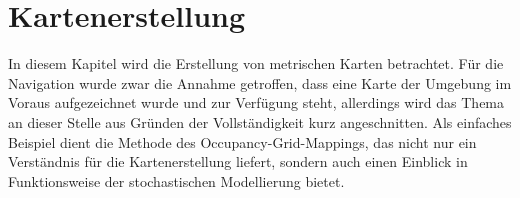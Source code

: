 \chapter{Kartenerstellung}
In diesem Kapitel wird die Erstellung von metrischen Karten betrachtet. Für die Navigation wurde zwar die Annahme getroffen, dass eine Karte der Umgebung im Voraus aufgezeichnet wurde und zur Verfügung steht, allerdings wird das Thema an dieser Stelle aus Gründen der Vollständigkeit kurz angeschnitten. Als einfaches Beispiel dient die Methode des Occupancy-Grid-Mappings, das nicht nur ein Verständnis für die Kartenerstellung liefert, sondern auch einen Einblick in Funktionsweise der stochastischen Modellierung bietet.

